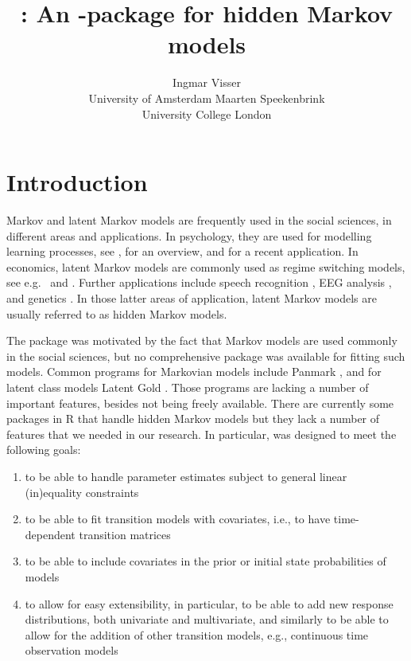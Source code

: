 \documentclass[article]{jss}
\author{Ingmar Visser\\University of Amsterdam \And 
        Maarten Speekenbrink\\University College London}
\title{\pkg{depmixS4} : An \proglang{R}-package for hidden Markov models}
\begin{document}



\section{Introduction}

Markov and latent Markov models are frequently used in the social
sciences, in different areas and applications.  In psychology, they
are used for modelling learning processes, see \citet{Wickens1982},
for an overview, and \citet{Schmittmann2006} for a recent application.
In economics, latent Markov models are commonly used as regime
switching models, see e.g.\ \citet{Kim1994} and \citet{Ghysels1994}.
Further applications include speech recognition \citep{Rabiner1989},
EEG analysis \citep{Rainer2000}, and genetics \citep{Krogh1998}.  In
those latter areas of application, latent Markov models are usually
referred to as hidden Markov models.

The  package was motivated by the fact that Markov
models are used commonly in the social sciences, but no comprehensive
package was available for fitting such models.  Common programs for
Markovian models include Panmark \citep{Pol1996}, and for latent class
models Latent Gold \citep{Vermunt2003}.  Those programs are lacking a
number of important features, besides not being freely available.
There are currently some packages in R that handle hidden Markov
models but they lack a number of features that we needed in our
research.  In particular,  was designed to meet the
following goals:
\begin{enumerate}
	
	\item to be able to handle parameter estimates subject to general
	linear (in)equality constraints
	
	\item to be able to fit transition models with covariates, i.e.,
	to have time-dependent transition matrices
	
	\item to be able to include covariates in the prior or initial
	state probabilities of models
	
	\item to allow for easy extensibility, in particular, to be able
	to add new response distributions, both univariate and
	multivariate, and similarly to be able to allow for the addition
	of other transition models, e.g., continuous time observation
	models
	
\end{enumerate}
\end{document}
